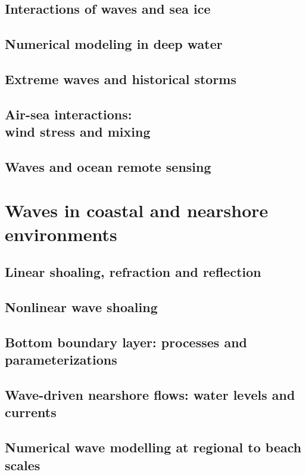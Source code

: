 \documentclass[a4paper]{book}  %
\begin{document}
\chapter{Interactions of waves and sea ice}\label{ch_ice}

\cleardoublepage
\chapter{Numerical modeling in deep water}\label{ch_model}

\cleardoublepage
\chapter{Extreme waves and historical storms}\label{ch_histo}

\cleardoublepage
\chapter{Air-sea interactions: \\ wind stress and mixing}\label{ch_ioa}

\cleardoublepage
\chapter{Waves and ocean remote sensing}\label{ch_tele}

\cleardoublepage


\part{Waves in coastal and nearshore environments}
\chapter{Linear shoaling, refraction and reflection}\label{ch5}

\cleardoublepage
\chapter{Nonlinear wave shoaling}\label{ch_surf}

\cleardoublepage
\chapter{Bottom boundary layer: processes and parameterizations}\label{ch_bbl}

\cleardoublepage
\chapter{Wave-driven nearshore flows: water levels and currents}\label{ch_littoral}

\cleardoublepage
\chapter{Numerical wave modelling at regional to beach scales}\label{ch_model_coastal}

\cleardoublepage





\end{document}
